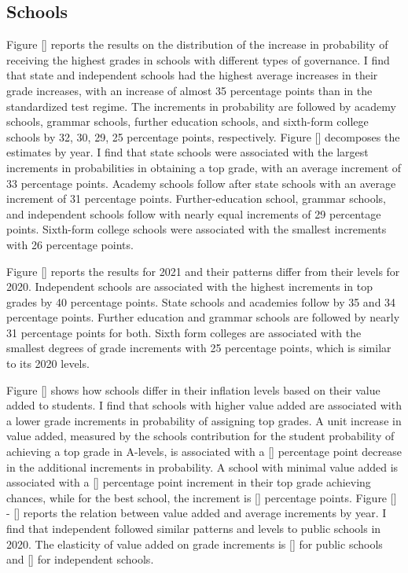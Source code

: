\subsection{Schools}



Figure [] reports the results on the distribution of the increase in probability of receiving the highest grades in schools with different types of governance. I find that state and independent schools had the highest average increases in their grade increases, with an increase of almost 35 percentage points than in the standardized test regime. The increments in probability are followed by academy schools, grammar schools, further education schools, and sixth-form college schools by 32, 30, 29, 25 percentage points, respectively. Figure [] decomposes the estimates by year. I find that state schools were associated with the largest increments in probabilities in obtaining a top grade, with an average increment of 33 percentage points. Academy schools follow after state schools with an average increment of 31 percentage points. Further-education school, grammar schools, and independent schools follow with nearly equal increments of 29 percentage points. Sixth-form college schools were associated with the smallest increments with 26 percentage points. 

Figure [] reports the results for 2021 and their patterns differ from their levels for 2020. Independent schools are associated with the highest increments in top grades by 40 percentage points. State schools and academies follow by 35 and 34 percentage points. Further education and grammar schools are followed by nearly 31 percentage points for both. Sixth form colleges are associated with the smallest degrees of grade increments with 25 percentage points, which is similar to its 2020 levels. 

Figure [] shows how schools differ in their inflation levels based on their value added to students. I find that schools with higher value added are associated with a lower grade increments in probability of assigning top grades. A unit increase in value added, measured by the schools contribution for the student probability of achieving a top grade in A-levels, is associated with a [] percentage point decrease in the additional increments in probability. A school with minimal value added is associated with a [] percentage point increment in their top grade achieving chances, while for the best school, the increment is [] percentage points. Figure [] - [] reports the relation between value added and average increments by year. I find that independent followed similar patterns and levels to public schools in 2020. The elasticity of value added on grade increments is [] for public schools and [] for independent schools. 

